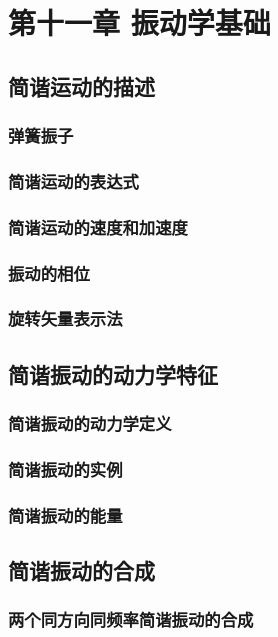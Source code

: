 \chapter{第十一章 振动学基础}

\section{简谐运动的描述}
    \subsection{弹簧振子}
    \subsection{简谐运动的表达式}
    \subsection{简谐运动的速度和加速度}
    \subsection{振动的相位}
    \subsection{旋转矢量表示法}

\section{简谐振动的动力学特征}
    \subsection{简谐振动的动力学定义}
    \subsection{简谐振动的实例}
    \subsection{简谐振动的能量}

\section{简谐振动的合成}
    \subsection{两个同方向同频率简谐振动的合成}
